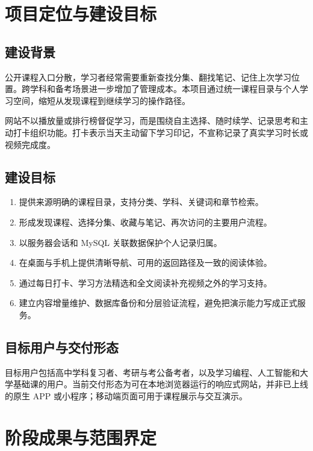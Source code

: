 \documentclass[UTF8,12pt,a4paper,openany,oneside]{ctexbook}
\begin{document}
\tableofcontents
\mainmatter

\chapter{项目定位与建设目标}
\section{建设背景}
公开课程入口分散，学习者经常需要重新查找分集、翻找笔记、记住上次学习位置。跨学科和备考场景进一步增加了管理成本。本项目通过统一课程目录与个人学习空间，缩短从发现课程到继续学习的操作路径。

网站不以播放量或排行榜督促学习，而是围绕自主选择、随时续学、记录思考和主动打卡组织功能。打卡表示当天主动留下学习印记，不宣称记录了真实学习时长或视频完成度。

\section{建设目标}
\begin{enumerate}
\item 提供来源明确的课程目录，支持分类、学科、关键词和章节检索。
\item 形成发现课程、选择分集、收藏与笔记、再次访问的主要用户流程。
\item 以服务器会话和 MySQL 关联数据保护个人记录归属。
\item 在桌面与手机上提供清晰导航、可用的返回路径及一致的阅读体验。
\item 通过每日打卡、学习方法精选和全文阅读补充视频之外的学习支持。
\item 建立内容增量维护、数据库备份和分层验证流程，避免把演示能力写成正式服务。
\end{enumerate}

\section{目标用户与交付形态}
目标用户包括高中学科复习者、考研与考公备考者，以及学习编程、人工智能和大学基础课的用户。当前交付形态为可在本地浏览器运行的响应式网站，并非已上线的原生 APP 或小程序；移动端页面可用于课程展示与交互演示。

\chapter{阶段成果与范围界定}
\end{document}
